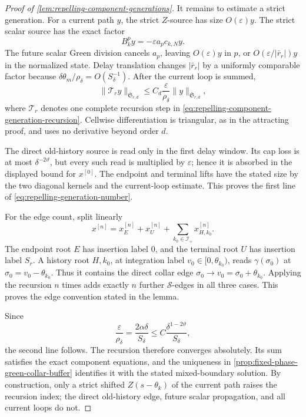 \begin{proof}[Proof of
\cref{lem:repelling-component-generations}]
It remains to estimate a strict generation.  For a current path \(y\), the
strict \(Z\)-source has size \(O(\varepsilon)y\).  The strict scalar source
has the exact factor
\[
 B_k^py=-\varepsilon a_pc_{k,N}y.
\]
The future scalar Green division cancels \(a_p\), leaving
\(O(\varepsilon)y\) in \(p\), or
\(O(\varepsilon/|\bar r_r|)y\) in the normalized state.  Delay translation
changes \(|\bar r_r|\) by a uniformly comparable factor because
\(\delta\theta_m/\rho_\delta=O(S_\delta^{-1})\).  After the current loop is
summed,
\begin{equation}
 \|\mathscr T_ry\|_{\mathfrak S_{r,d}}
 \le C_d\frac{\varepsilon}{\rho_\delta}
          \|y\|_{\mathfrak S_{r,d}},               \label{eq:repelling-strict-generation-proof}
\end{equation}
where \(\mathscr T_r\) denotes one complete recursion step in
\cref{eq:repelling-component-generation-recursion}.  Cellwise
differentiation is triangular, as in the attracting proof, and uses no
derivative beyond order \(d\).

The direct old-history source is read only in the first delay window.  Its
cap loss is at most \(\delta^{-2\vartheta}\), but every such read is
multiplied by \(\varepsilon\); hence it is absorbed in the displayed bound
for \(x^{[0]}\).  The endpoint and terminal lifts have the stated size by
the two diagonal kernels and the current-loop estimate.  This proves the
first line of \cref{eq:repelling-generation-number}.

For the edge count, split linearly
\[
 x^{[n]}=x_E^{[n]}+x_U^{[n]}
       +\sum_{k_0\in\mathcal I_+}x_{H,k_0}^{[n]}.
\]
The endpoint root \(E\) has insertion label \(0\), and the terminal root
\(U\) has insertion label \(S_r\).  A history root \(H,k_0\), at integration
label \(v_0\in[0,\theta_{k_0})\), reads
\(\gamma(\sigma_0)\) at
\(\sigma_0=v_0-\theta_{k_0}\).  Thus it contains the direct collar edge
\(\sigma_0\to v_0=\sigma_0+\theta_{k_0}\).  Applying the recursion \(n\)
times adds exactly \(n\) further \(\mathscr S\)-edges in all three cases.
This proves the edge convention stated in the lemma.

Since
\[
 \frac{\varepsilon}{\rho_\delta}
 =\frac{2\alpha\delta}{S_\delta}
 \le C\frac{\delta^{1-2\vartheta}}{S_\delta},
\]
the second line follows.  The recursion therefore converges absolutely.
Its sum satisfies the exact component equations, and the uniqueness in
\cref{prop:fixed-phase-green-collar-buffer} identifies it with the stated
mixed-boundary solution.  By construction, only a strict shifted
\(Z(s-\theta_k)\) of the current path raises the recursion index; the direct
old-history edge, future scalar propagation, and all current loops do not.
\end{proof}

